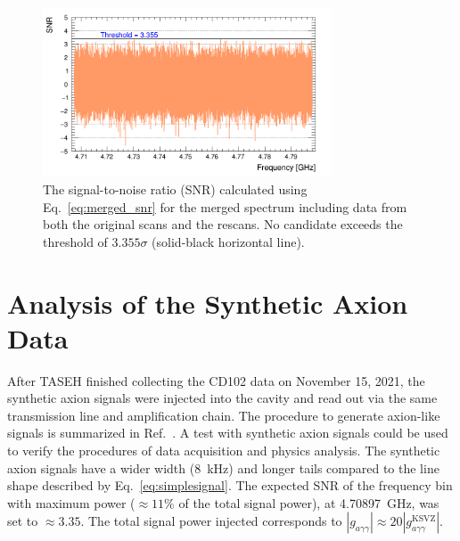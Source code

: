 \documentclass[%
reprint, %
superscriptaddress,
 amsmath,amssymb,
 aps
]{revtex4-2}
\begin{document}
\begin{figure}[hbt!]
    \centering
    \includegraphics[width=8.6cm]{Figure4.png}
    \caption{The signal-to-noise ratio (SNR) calculated using Eq.~\eqref{eq:merged_snr} for the merged spectrum including data from both the original 
scans and the rescans. No candidate exceeds the threshold of 
$3.355\sigma$ (solid-black horizontal line). }
    \label{fig:SNR_merged}
\end{figure}


\section{Analysis of the Synthetic Axion Data}\label{sec:faxion}
After TASEH finished collecting the CD102 data on November 15, 2021, 
the synthetic axion signals were injected into the cavity and read out via the 
same transmission line and amplification chain. The procedure 
to generate axion-like signals is summarized in 
Ref.~\cite{TASEHInstrumentation}. 
A test with synthetic axion signals could be used to verify the procedures of 
data acquisition and physics analysis. The synthetic axion signals 
have a wider width (8~kHz) and longer tails compared to the line shape 
described by Eq.~\eqref{eq:simplesignal}. 
The expected SNR of the frequency bin with maximum power ($\approx 11\%$ of 
the total signal power), 
 at 4.70897~GHz, was set to $\approx 3.35$. 
The total signal power injected 
corresponds to $\left|g_{a\gamma\gamma}\right|\approx 20 \left|g_{a\gamma\gamma}^\text{KSVZ}\right|$. 
\end{document}
